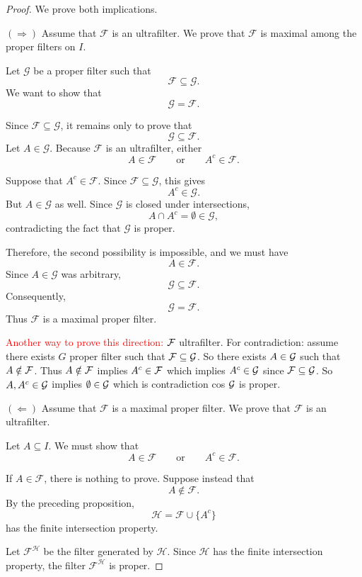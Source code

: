 {\begin{proof}
We prove both implications.

\noindent\((\Rightarrow)\)
Assume that \(\mathcal{F}\) is an ultrafilter. We prove that
\(\mathcal{F}\) is maximal among the proper filters on \(I\).

Let \(\mathcal{G}\) be a proper filter such that
\[
\mathcal{F}\subseteq\mathcal{G}.
\]
We want to show that
\[
\mathcal{G}=\mathcal{F}.
\]

Since \(\mathcal{F}\subseteq\mathcal{G}\), it remains only to prove that
\[
\mathcal{G}\subseteq\mathcal{F}.
\]
Let \(A\in\mathcal{G}\). Because \(\mathcal{F}\) is an ultrafilter, either
\[
A\in\mathcal{F}
\qquad\text{or}\qquad
A^c\in\mathcal{F}.
\]

Suppose that \(A^c\in\mathcal{F}\). Since
\(\mathcal{F}\subseteq\mathcal{G}\), this gives
\[
A^c\in\mathcal{G}.
\]
But \(A\in\mathcal{G}\) as well. Since \(\mathcal{G}\) is closed under
intersections,
\[
A\cap A^c=\emptyset\in\mathcal{G},
\]
contradicting the fact that \(\mathcal{G}\) is proper.

Therefore, the second possibility is impossible, and we must have
\[
A\in\mathcal{F}.
\]
Since \(A\in\mathcal{G}\) was arbitrary,
\[
\mathcal{G}\subseteq\mathcal{F}.
\]
Consequently,
\[
\mathcal{G}=\mathcal{F}.
\]
Thus \(\mathcal{F}\) is a maximal proper filter.

\textcolor{red}{Another way to prove this direction:}
$\mathcal{F}$ ultrafilter. For contradiction: assume there exists $G$ proper filter such that $\mathcal{F} \subseteq \mathcal{G}$. So there exists $A \in \mathcal{G}$ such that $A \notin \mathcal{F}$. Thus $A \notin \mathcal{F}$ implies $A^c \in \mathcal{F}$ which implies $A^c \in \mathcal{G}$ since $\mathcal{F} \subseteq \mathcal{G}$. So $A, A^c \in \mathcal{G}$ implies $\emptyset \in \mathcal{G}$ which is contradiction cos $\mathcal{G}$ is proper.

\noindent\((\Leftarrow)\)
Assume that \(\mathcal{F}\) is a maximal proper filter. We prove that
\(\mathcal{F}\) is an ultrafilter.

Let \(A\subseteq I\). We must show that
\[
A\in\mathcal{F}
\qquad\text{or}\qquad
A^c\in\mathcal{F}.
\]

If \(A\in\mathcal{F}\), there is nothing to prove. Suppose instead that
\[
A\notin\mathcal{F}.
\]
By the preceding proposition,
\[
\mathcal{H}
=
\mathcal{F}\cup\{A^c\}
\]
has the finite intersection property.

Let \(\mathcal{F}^{\mathcal{H}}\) be the filter generated by
\(\mathcal{H}\). Since \(\mathcal{H}\) has the finite intersection
property, the filter \(\mathcal{F}^{\mathcal{H}}\) is proper.


\end{proof}}
